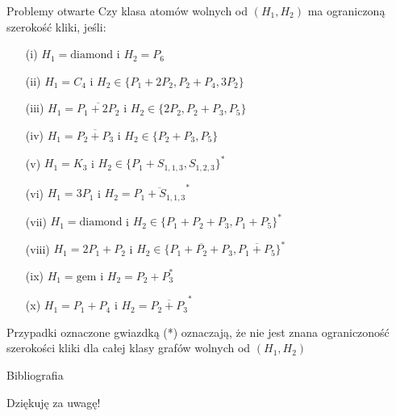 \documentclass[polish]{beamer}
\begin{document}
\begin{frame}{Problemy otwarte}
    Czy klasa atomów wolnych od $(H_1, H_2)$ ma ograniczoną szerokość kliki, jeśli:
    \begin{itemize}
        \item[(i)] $H_1 = \text{diamond}$ i $H_2 = P_6$
        \item[(ii)] $H_1 = C_4$ i $H_2 \in \{P_1 + 2P_2, P_2 + P_4, 3P_2\}$
        \item[(iii)] $H_1 = \overline{P_1 + 2P_2}$ i $H_2 \in \{2P_2, P_2 + P_3, P_5\}$
        \item[(iv)] $H_1 = \overline{P_2 + P_3}$ i $H_2 \in \{P_2 + P_3, P_5\}$
        \item[(v)] $H_1 = K_3$ i $H_2 \in \{P_1 + S_{1,1,3}, S_{1,2,3}\}^*$
        \item[(vi)] $H_1 = 3P_1$ i $H_2 = \overline{P_1 + S_{1,1,3}}^*$
        \item[(vii)] $H_1 = \text{diamond}$ i $H_2 \in \{P_1 + P_2 + P_3, P_1 + P_5\}^*$
        \item[(viii)] $H_1 = 2P_1 + P_2$ i $H_2 \in \{\overline{P_1 + P_2 + P_3}, \overline{P_1 + P_5}\}^*$
        \item[(ix)] $H_1 = \text{gem}$ i $H_2 = P_2 + P_3^*$
        \item[(x)] $H_1 = P_1 + P_4$ i $H_2 = \overline{P_2 + P_3}^*$
    \end{itemize}
    Przypadki oznaczone gwiazdką (*) oznaczają, że nie jest znana ograniczoność szerokości kliki dla całej klasy grafów wolnych od $(H_1, H_2)$ 
\end{frame}

\nocite{c_a_r_orig, c_s_r, b_s_p, h_p_a}
\begin{frame}[allowframebreaks]{Bibliografia}
    
    
\end{frame}

\begin{frame}
    \begin{center}
        {\huge Dziękuję za uwagę!}
    \end{center}
\end{frame}

\end{document}
